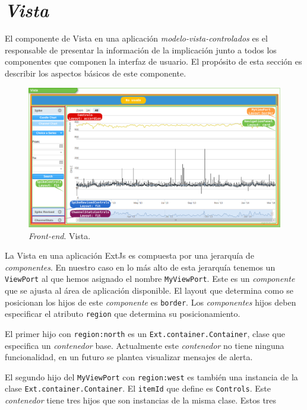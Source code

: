 \section{\emph{Vista}}
	El componente de Vista en una aplicación \emph{modelo-vista-controlados}\cite{MVCWiki} es el responsable de presentar la información de la
	implicación junto a todos los componentes que componen la interfaz de usuario.  El propósito de esta sección es describir los aspectos básicos
	de este componente.
	\begin{figure}[h]
		\centering
		\includegraphics[keepaspectratio, width=1\textwidth]{./img/vista.png}
		\caption{\emph{Front-end}. Vista.}   
		\label{fig:vista}
	\end{figure}
	\par
	La Vista en una aplicación ExtJs es compuesta por una jerarquía de \emph{componentes}. En nuestro caso en lo más alto de esta jerarquía
	tenemos un \texttt{ViewPort} al que hemos asignado el nombre \texttt{MyViewPort}. Este es un \emph{componente} que se ajusta al área de
	aplicación disponible. El layout que determina como se posicionan los hijos de este \emph{componente} es \texttt{border}. Los
	\emph{componentes} hijos deben especificar el atributo \texttt{region} que determina su posicionamiento.
	\par
	El primer hijo con \texttt{region:north} es un \texttt{Ext.container.Container}, clase que especifica un \emph{contenedor} base. Actualmente este
	\emph{contenedor} no tiene ninguna funcionalidad, en un futuro se plantea visualizar mensajes de alerta.
	\par
	El segundo hijo del \texttt{MyViewPort} con \texttt{region:west} es también una instancia de la clase \texttt{Ext.container.Container}. El
	\texttt{itemId} que define es \texttt{Controls}. Este \emph{contenedor} tiene tres hijos que son instancias de la misma clase. Estos tres
